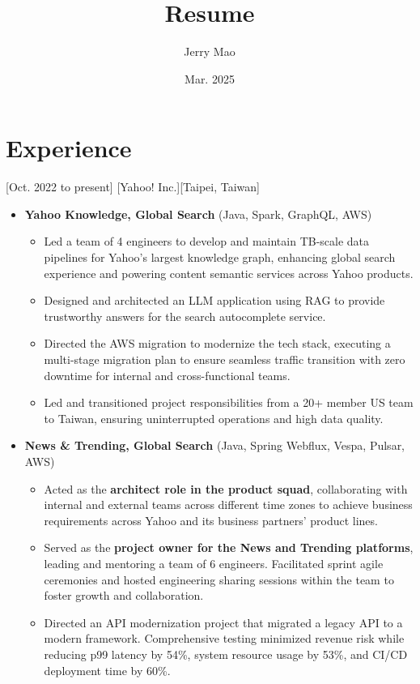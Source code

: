 \documentclass{article}
\title{Resume}
\author{Jerry Mao}
\date{Mar. 2025}
\begin{document}
\makecvtitle %

\section{Experience}

[Oct. 2022 to present]
[Yahoo! Inc.][Taipei, Taiwan]
\begin{itemize}
	\item \textbf{Yahoo Knowledge, Global Search} (Java, Spark, GraphQL, AWS) 
		\begin{itemize}
			\item Led a team of 4 engineers to develop and maintain TB-scale data pipelines for Yahoo's largest knowledge graph, enhancing global search experience and powering content semantic services across Yahoo products.
			\item Designed and architected an LLM application using RAG to provide trustworthy answers for the search autocomplete service.
			\item Directed the AWS migration to modernize the tech stack, executing a multi-stage migration plan to ensure seamless traffic transition with zero downtime for internal and cross-functional teams.
			\item Led and transitioned project responsibilities from a 20+ member US team to Taiwan, ensuring uninterrupted operations and high data quality.
		\end{itemize}
	\item \textbf{News \& Trending, Global Search} (Java, Spring Webflux, Vespa, Pulsar, AWS) 
		\begin{itemize}
			\item Acted as the \textbf{architect role in the product squad}, collaborating with internal and external teams across different time zones to achieve business requirements across Yahoo and its business partners' product lines.
			\item Served as the \textbf{project owner for the News and Trending platforms}, leading and mentoring a team of 6 engineers. Facilitated sprint agile ceremonies and hosted engineering sharing sessions within the team to foster growth and collaboration.
			\item Directed an API modernization project that migrated a legacy API to a modern framework. Comprehensive testing minimized revenue risk while reducing p99 latency by 54\%, system resource usage by 53\%, and CI/CD deployment time by 60\%.

\end{itemize}
\end{itemize}
\end{document}

